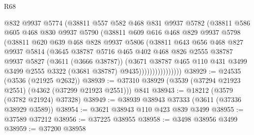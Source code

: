 \begin{lexlean}{R68}
\begin{coremodule}
                      @832
                      @9937
                      @5774
                      (@38811
                        @557
                        @582
                        @468
                        @831
                        @9937
                        @5782
                        (@38811
                          @586
                          @605
                          @468
                          @830
                          @9937
                          @5790
                          (@38811
                            @609
                            @616
                            @468
                            @829
                            @9937
                            @5798
                            (@38811
                              @620
                              @639
                              @468
                              @828
                              @9937
                              @5806
                              (@38811
                                @643
                                @656
                                @468
                                @827
                                @9937
                                @5814
                                (@3645
                                  @38787
                                  @5716
                                  @465
                                  @402
                                  @468
                                  @826
                                  @2555
                                  @38787
                                  @9937
                                  @5827
                                  (@3611 (@3666 @38787))
                                  (@3671
                                    @38787
                                    @465
                                    @110
                                    @431
                                    @3499
                                    @3499
                                    @2555
                                    @3322
                                    (@3681 @38787)
                                    @9435))))))))))))))))
@38929 := @24535 (@3536 (@21925 @2632))
@38939 := @37310 @38929 (@3539 (@37294 @21923 @2551) (@4362 (@37299 @21923 @2551))) @841
@38943 := @18212 (@3579 (@3782 @21924) @37328)
@38949 := @38939 @38943 @37333 (@3611 (@37336 @38929 @3589))
@38954 := @3621 @38943 @110 @423 @839 @3499
@38955 := @37589 @37212
@38956 := @37225 @38955
@38958 := @3498 @38956 @3499
@38959 := @37200 @38958

\end{coremodule}
\end{lexlean}
